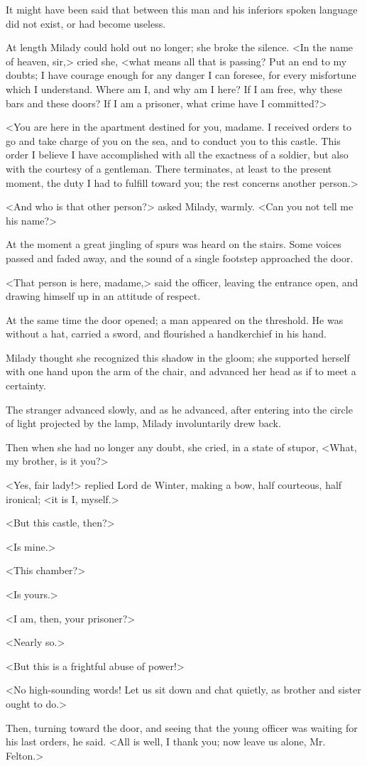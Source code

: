 It might have been said that between this man and his inferiors spoken language did not exist, or had become useless. 

At length Milady could hold out no longer; she broke the silence. <In the name of heaven, sir,> cried she, <what means all that is passing? Put an end to my doubts; I have courage enough for any danger I can foresee, for every misfortune which I understand. Where am I, and why am I here? If I am free, why these bars and these doors? If I am a prisoner, what crime have I committed?> 

<You are here in the apartment destined for you, madame. I received orders to go and take charge of you on the sea, and to conduct you to this castle. This order I believe I have accomplished with all the exactness of a soldier, but also with the courtesy of a gentleman. There terminates, at least to the present moment, the duty I had to fulfill toward you; the rest concerns another person.> 

<And who is that other person?> asked Milady, warmly. <Can you not tell me his name?> 

At the moment a great jingling of spurs was heard on the stairs. Some voices passed and faded away, and the sound of a single footstep approached the door. 

<That person is here, madame,> said the officer, leaving the entrance open, and drawing himself up in an attitude of respect. 

At the same time the door opened; a man appeared on the threshold. He was without a hat, carried a sword, and flourished a handkerchief in his hand. 

Milady thought she recognized this shadow in the gloom; she supported herself with one hand upon the arm of the chair, and advanced her head as if to meet a certainty. 

The stranger advanced slowly, and as he advanced, after entering into the circle of light projected by the lamp, Milady involuntarily drew back. 

Then when she had no longer any doubt, she cried, in a state of stupor, <What, my brother, is it you?> 

<Yes, fair lady!> replied Lord de Winter, making a bow, half courteous, half ironical; <it is I, myself.> 

<But this castle, then?> 

<Is mine.> 

<This chamber?> 

<Is yours.> 

<I am, then, your prisoner?> 

<Nearly so.> 

<But this is a frightful abuse of power!> 

<No high-sounding words! Let us sit down and chat quietly, as brother and sister ought to do.> 

Then, turning toward the door, and seeing that the young officer was waiting for his last orders, he said. <All is well, I thank you; now leave us alone, Mr. Felton.> 
